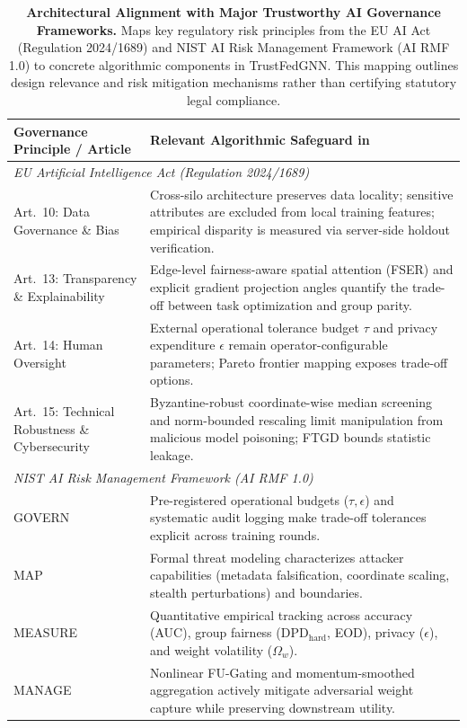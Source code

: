 \begin{table}[t]
\centering
\small
\caption{\textbf{Architectural Alignment with Major Trustworthy AI Governance Frameworks.}
Maps key regulatory risk principles from the EU AI Act (Regulation 2024/1689) and NIST AI Risk Management Framework (AI RMF 1.0) to concrete algorithmic components in TrustFedGNN.
This mapping outlines design relevance and risk mitigation mechanisms rather than certifying statutory legal compliance.}
\label{tab:compliance}
\begin{tabular}{p{}p{}}
\toprule
\textbf{Governance Principle / Article} & \textbf{Relevant Algorithmic Safeguard in \MethodName{}} \\
\midrule
\multicolumn{2}{l}{\textit{EU Artificial Intelligence Act (Regulation 2024/1689)}} \\
Art.~10: Data Governance \& Bias & Cross-silo architecture preserves data locality; sensitive attributes are excluded from local training features; empirical disparity is measured via server-side holdout verification. \\
Art.~13: Transparency \& Explainability & Edge-level fairness-aware spatial attention (FSER) and explicit gradient projection angles quantify the trade-off between task optimization and group parity. \\
Art.~14: Human Oversight & External operational tolerance budget $\tau$ and privacy expenditure $\epsilon$ remain operator-configurable parameters; Pareto frontier mapping exposes trade-off options. \\
Art.~15: Technical Robustness \& Cybersecurity & Byzantine-robust coordinate-wise median screening and norm-bounded rescaling limit manipulation from malicious model poisoning; FTGD bounds statistic leakage. \\
\midrule
\multicolumn{2}{l}{\textit{NIST AI Risk Management Framework (AI RMF 1.0)}} \\
GOVERN & Pre-registered operational budgets ($\tau, \epsilon$) and systematic audit logging make trade-off tolerances explicit across training rounds. \\
MAP & Formal threat modeling characterizes attacker capabilities (metadata falsification, coordinate scaling, stealth perturbations) and boundaries. \\
MEASURE & Quantitative empirical tracking across accuracy (AUC), group fairness ($\text{DPD}_{\text{hard}}$, EOD), privacy ($\epsilon$), and weight volatility ($\Omega_w$). \\
MANAGE & Nonlinear FU-Gating and momentum-smoothed aggregation actively mitigate adversarial weight capture while preserving downstream utility. \\
\bottomrule
\end{tabular}
\end{table}
